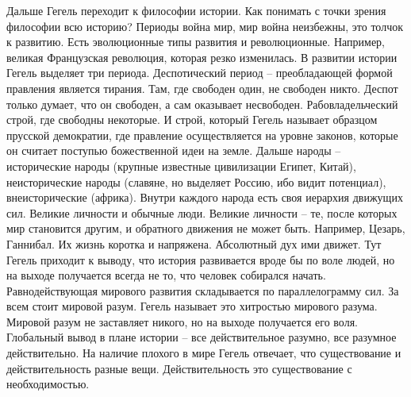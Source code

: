 \documentclass[a4paper, 12pt]{article}
\begin{document}
Дальше Гегель переходит к философии истории. Как понимать с точки зрения философии всю историю? Периоды война мир, мир война неизбежны, это толчок к развитию. Есть эволюционные типы развития и революционные. Например, великая Французская революция, которая резко изменилась. В развитии истории Гегель выделяет три периода. Деспотический период -- преобладающей формой правления является тирания. Там, где свободен один, не свободен никто. Деспот только думает, что он свободен, а сам оказывает несвободен. Рабовладельческий строй, где свободны некоторые. И строй, который Гегель называет образцом прусской демократии, где правление осуществляется на уровне законов, которые он считает поступью божественной идеи на земле. Дальше народы -- исторические народы (крупные известные цивилизации Египет, Китай), неисторические народы (славяне, но выделяет Россию, ибо видит потенциал), внеисторические (африка). Внутри каждого народа есть своя иерархия движущих сил. Великие личности и обычные люди. Великие личности -- те, после которых мир становится другим, и обратного движения не может быть. Например, Цезарь, Ганнибал. Их жизнь коротка и напряжена. Абсолютный дух ими движет. Тут Гегель приходит к выводу, что история развивается вроде бы по воле людей, но на выходе получается всегда не то, что человек собирался начать. Равнодействующая мирового развития складывается по параллелограмму сил. За всем стоит мировой разум. Гегель называет это хитростью мирового разума. Мировой разум не заставляет никого, но на выходе получается его воля. Глобальный вывод в плане истории -- все действительное разумно, все разумное действительно. На наличие плохого в мире Гегель отвечает, что существование и действительность разные вещи. Действительность это существование с необходимостью. 


\def\fierbah{Фейербах}
\end{document}
